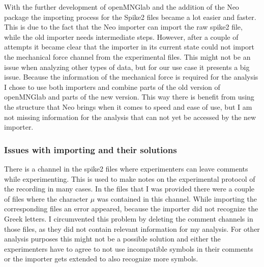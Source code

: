 With the further development of openMNGlab and the addition of the Neo package the importing process for the Spike2 files became a lot easier and faster. This is due to the fact that the Neo importer can import the raw spike2 file, while the old importer needs intermediate steps. However, after a couple of attempts it became clear that the importer in its current state could not import the mechanical force channel from the experimental files. This might not be an issue when analyzing other types of data, but for our use case it presents a big issue. Because the information of the mechanical force is required for the analysis I chose to use both importers and combine parts of the old version of openMNGlab and parts of the new version. This way there is benefit from using the structure that Neo brings when it comes to speed and ease of use, but I am not missing information for the analysis that can not yet be accessed by the new importer.

\subsubsection{Issues with importing and their solutions}
There is a channel in the spike2 files where experimenters can leave comments while experimenting. This is used to make notes on the experimental protocol of the recording in many cases. In the files that I was provided there were a couple of files where the character $\mu$ was contained in this channel. While importing the corresponding files an error appeared, because the importer did not recognize the Greek letters. I circumvented this problem by deleting the comment channels in those files, as they did not contain relevant information for my analysis. For other analysis purposes this might not be a possible solution and either the experimenters have to agree to not use incompatible symbols in their comments or the importer gets extended to also recognize more symbols.

